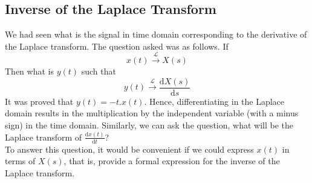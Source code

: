 \subsection{Inverse of the Laplace Transform}

We had seen what is the signal in time domain corresponding to the derivative of the Laplace transform. The question asked was as follows. If
\[
x(t) \xrightarrow{\ \mathcal{L}\ } X(s)
\]
Then what is $y(t)$ such that
\[
y(t) \xrightarrow{\ \mathcal{L}\ } \frac{\mathrm{d}X(s)}{\mathrm{d}s}
\]
It was proved that $y(t)=-t.x(t)$. Hence, differentiating in the Laplace domain results in the multiplication by the independent variable (with a minus sign) in the time domain. Similarly, we can ask the question, what will be the Laplace transform of $\frac{\mathrm{d}x(t)}{\mathrm{d}t}$?\\
To answer this question, it would be convenient if we could express $x(t)$ in terms of $X(s)$, that is, provide a formal expression for the inverse of the Laplace transform.\\
